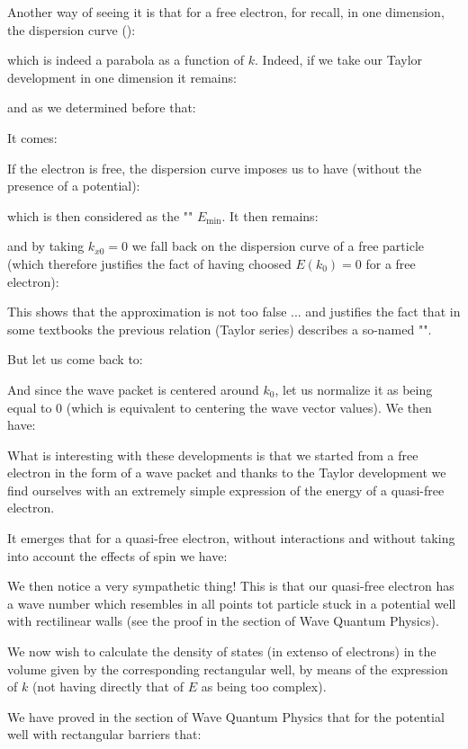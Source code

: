  	Another way of seeing it is that for a free electron, for recall, in one dimension, the dispersion curve ():
	
	which is indeed a parabola as a function of $k$. Indeed, if we take our Taylor development in one dimension it remains:
	
	and as we determined before that:
	
	It comes:
	
	If the electron is free, the dispersion curve imposes us to have (without the presence of a potential):
	
	which is then considered as the "" $E_{\min}$. It then remains:
	
	and by taking $k_{x0}=0$ we fall back on the dispersion curve of a free particle (which therefore justifies the fact of having choosed $E(k_0)=0$ for a free electron):
	
	This shows that the approximation is not too false ... and justifies the fact that in some textbooks the previous relation (Taylor series) describes a so-named "".

	But let us come back to:
	
	And since the wave packet is centered around $k_0$, let us normalize it as being equal to $0$ (which is equivalent to centering the wave vector values). We then have:
	
	What is interesting with these developments is that we started from a free electron in the form of a wave packet and thanks to the Taylor development we find ourselves with an extremely simple expression of the energy of a quasi-free electron.

	It emerges that for a quasi-free electron, without interactions and without taking into account the effects of spin we have:
	
	We then notice a very sympathetic thing! This is that our quasi-free electron has a wave number which resembles in all points tot particle stuck in a potential well with rectilinear walls (see the proof in the section of Wave Quantum Physics).

	We now wish to calculate the density of states (in extenso of electrons) in the volume given by the corresponding rectangular well, by means of the expression of $k$ (not having directly that of $E$ as being too complex).

	We have proved in the section of Wave Quantum Physics that for the potential well with rectangular barriers that:
	
